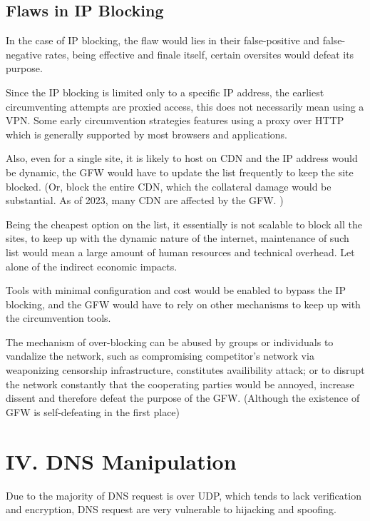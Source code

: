 \documentclass[nonacm,sigplan,screen]{acmart}
\begin{document}
\hypertarget{flaws-in-ip-blocking}{%
\subsection{Flaws in IP Blocking}\label{flaws-in-ip-blocking}}

In the case of IP blocking, the flaw would lies in their false-positive
and false-negative rates, being effective and finale itself, certain
oversites would defeat its purpose.

Since the IP blocking is limited only to a specific IP address, the
earliest circumventing attempts are proxied access, this does not
necessarily mean using a VPN. Some early circumvention strategies
features using a proxy over HTTP which is generally supported by most
browsers and applications. \cite{18_GFWSpaceTime}

Also, even for a single site, it is likely to host on CDN and the IP
address would be dynamic, the GFW would have to update the list
frequently to keep the site blocked. (Or, block the entire CDN, which
the collateral damage would be substantial. As of 2023, many CDN are
affected by the GFW. \cite{19_detect})

Being the cheapest option on the list, it essentially is not scalable to
block all the sites, to keep up with the dynamic nature of the internet,
maintenance of such list would mean a large amount of human resources
and technical overhead. Let alone of the indirect economic impacts.

Tools with minimal configuration and cost would be enabled to bypass the
IP blocking, and the GFW would have to rely on other mechanisms to keep
up with the circumvention tools.

The mechanism of over-blocking can be abused by groups or individuals to
vandalize the network, such as compromising competitor's network via
weaponizing censorship infrastructure, constitutes availibility attack;
or to disrupt the network constantly that the cooperating parties would
be annoyed, increase dissent and therefore defeat the purpose of the
GFW. (Although the existence of GFW is self-defeating in the first
place)


\hypertarget{iv.-dns-manipulation}{%
\section{IV. DNS Manipulation}\label{iv.-dns-manipulation}}

Due to the majority of DNS request is over UDP, which tends to lack
verification and encryption, DNS request are very vulnerable to
hijacking and spoofing. \cite{20_dnsUDP}
\end{document}
